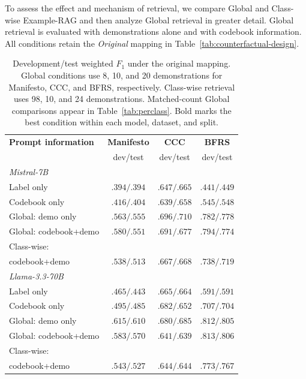 \documentclass[11pt]{article}
\begin{document}
To assess the effect and mechanism of retrieval, we compare Global and Class-wise Example-RAG and then analyze Global retrieval in greater detail. Global retrieval is evaluated with demonstrations alone and with codebook information. All conditions retain the \emph{Original} mapping in Table~\ref{tab:counterfactual-design}.

\begin{table}[t]
\centering
\setlength{\tabcolsep}{2pt}
\small

\begin{tabular}{lccc}
\toprule
\textbf{Prompt information} & \textbf{Manifesto} & \textbf{CCC} & \textbf{BFRS} \\
 & \footnotesize dev/test & \footnotesize dev/test & \footnotesize dev/test \\
\midrule
\multicolumn{4}{l}{\emph{Mistral-7B}} \\
Label only                  & $.394/.394$ & $.647/.665$ & $.441/.449$ \\
Codebook only               & $.416/.404$ & $.639/.658$ & $.545/.548$ \\
Global: demo only           & $.563/\mathbf{.555}$ & $\mathbf{.696}/\mathbf{.710}$ & $.782/\mathbf{.778}$ \\
Global: codebook+demo       & $\mathbf{.580}/.551$ & $.691/.677$ & $\mathbf{.794}/.774$ \\
Class-wise:  & &  &  \\
codebook+demo   & $.538/.513$ & $.667/.668$ & $.738/.719$ \\
\midrule
\multicolumn{4}{l}{\emph{Llama-3.3-70B}} \\
Label only                  & $.465/.443$ & $.665/.664$ & $.591/.591$ \\
Codebook only               & $.495/.485$ & $\mathbf{.682}/.652$ & $.707/.704$ \\
Global: demo only           & $\mathbf{.615}/\mathbf{.610}$ & $.680/\mathbf{.685}$ & $.812/.805$ \\
Global: codebook+demo       & $.583/.570$ & $.641/.639$ & $\mathbf{.813}/\mathbf{.806}$ \\
Class-wise: & &  &  \\
codebook+demo   & $.543/.527$ & $.644/.644$ & $.773/.767$ \\
\bottomrule
\end{tabular}%

\caption{Development/test weighted \(F_1\) under the original mapping. Global conditions use 8, 10, and 20 demonstrations for Manifesto,
CCC, and BFRS, respectively. Class-wise retrieval uses 98, 10,
and 24 demonstrations. Matched-count Global comparisons appear
in Table~\ref{tab:perclass}. Bold marks the best condition within each model, dataset, and split.}
\label{tab:headline}
\end{table}
\end{document}
